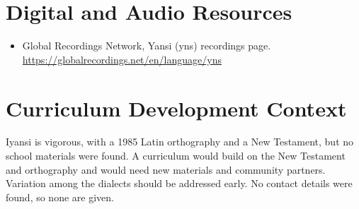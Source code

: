 \documentclass[12pt]{article}
\begin{document}
\section{Digital and Audio Resources}
\begin{itemize}
\item Global Recordings Network, Yansi (yns) recordings page. \url{https://globalrecordings.net/en/language/yns}
\end{itemize}

\section{Curriculum Development Context}
Iyansi is vigorous, with a 1985 Latin orthography and a New Testament, but no school materials were found. A curriculum would build on the New Testament and orthography and would need new materials and community partners. Variation among the dialects should be addressed early. No contact details were found, so none are given.
\end{document}
